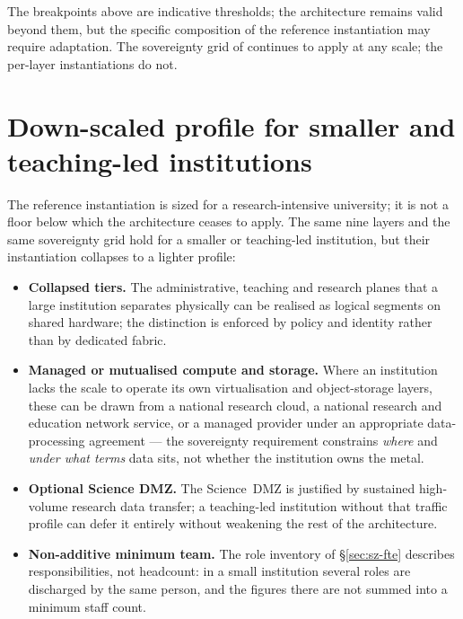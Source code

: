 \noindent The breakpoints above are indicative thresholds; the
architecture remains valid beyond them, but the specific composition
of the reference instantiation may require adaptation. The
sovereignty grid of  continues to
apply at any scale; the per-layer instantiations do not.

\section{Down-scaled profile for smaller and teaching-led institutions}
\label{sec:sz-downscale}

The reference instantiation is sized for a research-intensive
university; it is not a floor below which the architecture ceases to
apply. The same nine layers and the same sovereignty grid hold for a
smaller or teaching-led institution, but their instantiation collapses
to a lighter profile:

\begin{itemize}[nosep]
  \item \textbf{Collapsed tiers.} The administrative, teaching and
    research planes that a large institution separates physically can
    be realised as logical segments on shared hardware; the
    distinction is enforced by policy and identity rather than by
    dedicated fabric.
  \item \textbf{Managed or mutualised compute and storage.} Where an
    institution lacks the scale to operate its own virtualisation and
    object-storage layers, these can be drawn from a national research
    cloud, a national research and education network service, or a
    managed provider under
    an appropriate data-processing agreement --- the sovereignty
    requirement constrains \emph{where} and \emph{under what terms}
    data sits, not whether the institution owns the metal.
  \item \textbf{Optional Science DMZ.} The Science~DMZ is justified by
    sustained high-volume research data transfer; a teaching-led
    institution without that traffic profile can defer it entirely
    without weakening the rest of the architecture.
  \item \textbf{Non-additive minimum team.} The role inventory of
    \S\ref{sec:sz-fte} describes responsibilities, not headcount: in a
    small institution several roles are discharged by the same person,
    and the figures there are not summed into a minimum staff count.
\end{itemize}

